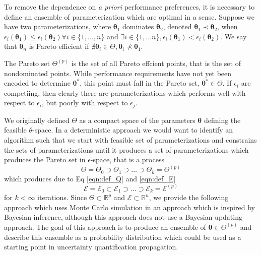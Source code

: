 To remove the dependence on \emph{a priori} performance preferences, it is necessary to define an ensemble of parameterization which are optimal in a sense.  Suppose we have two parameterizations, where $\bm{\theta}_1$ dominates $\bm{\theta}_2$, denoted $\bm{\theta}_1 \prec \bm{\theta}_2$, when $\epsilon_i(\bm{\theta}_1) \leq \epsilon_i(\bm{\theta}_2) \forall i \in \{1,...,n\}$ and
$\exists i \in \{1,...n\}, \epsilon_i(\bm{\theta}_1) < \epsilon_i(\bm{\theta}_2)$.
We say that $\bm{\theta}_n$ is Pareto efficient if $\nexists \bm{\theta}_i \in \Theta, \bm{\theta}_i \nprec \bm{\theta}_1$.

The Pareto set $\Theta^{(p)}$ is the set of all Pareto effcient points, that is the set of nondominated points.  While performance requirements have not yet been encoded to determine $\bm{\theta}^*$, this point must fall in the Pareto set, $\bm{\theta}^* \in \Theta$.  If $\epsilon_i$ are competiing, then clearly there are parameterizations which performs well with respect to $\epsilon_i$, but poorly with respect to $\epsilon_j$.

We originally defined $\Theta$ as a compact space of the parameters ${\bm{\theta}}$ defining the feasible $\theta$-space.  In a deterministic approach we would want to identify an algorithm such that we start with feasible set of parameterizations and constrains the sets of parameterizations until it produces a set of parameterizations which produces the Pareto set in $\epsilon$-space, that is a process
\begin{equation}
    \Theta = \Theta_0 \supset \Theta_1 \supset \hdots \supset \Theta_k = \Theta^{(p)}
\end{equation}
which produces due to Eq \ref{eqn:def_Q} and \ref{eqn:def_E}
\begin{equation}
    \mathcal{E} = \mathcal{E}_0 \subset \mathcal{E}_1 \supset \hdots \supset \mathcal{E}_k = \mathcal{E}^{(p)}
\end{equation}
for $k < \infty$ iterations.  Since $\Theta \subset \mathbb{R}^p$ and $\mathcal{E} \subset \mathbb{R}^n$, we provide the following approach which uses Monte Carlo simulation in an approach which is inspired by Bayesian inference, although this approach does not use a Bayesian updating approach.  The goal of this approach is to produce an ensemble of $\bm{\theta}\in \Theta^{(p)}$ and describe this ensemble as a probability distribution which could be used as a starting point in uncertainty quantification propagation.

